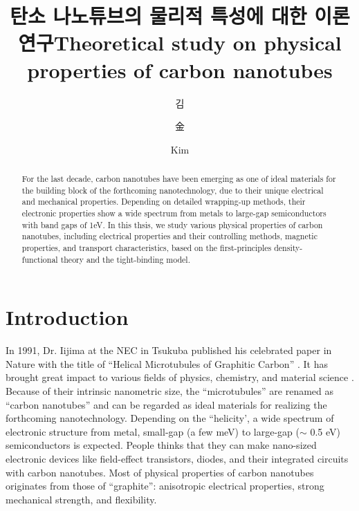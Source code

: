 \documentclass[doctor,english,final]{kaist-ucs}
\title[korean] {탄소 나노튜브의 물리적 특성에 대한 이론 연구}
\title[english]{Theoretical study on physical properties of
                carbon nanotubes}
\author[korean] {김}{용 현}
\author[chinese]{金}{容 賢}
\author[english]{Kim}{Yong-Hyun}
\begin{document}

    \begin{abstract}
        For the last decade, carbon nanotubes have been emerging as one
        of ideal materials for the building block of the forthcoming
        nanotechnology, due to their unique electrical and mechanical
        properties. Depending on detailed wrapping-up methods, their
        electronic properties show a wide spectrum from metals to
        large-gap semiconductors with band gaps of 1eV.
        In this thsis, we study various physical properties of carbon
        nanotubes, including electrical properties and their controlling
        methods, magnetic properties, and transport characteristics,
        based on the first-principles density-functional theory and
        the tight-binding model.
    \end{abstract}

    \tableofcontents

    \listoftables

    \listoffigures



\chapter{Introduction}

In 1991, Dr. Iijima at the NEC in Tsukuba published his celebrated
paper in Nature with the title of ``Helical Microtubules of Graphitic Carbon''
\cite{Iijima91}.
It has brought great impact to various fields of physics, chemistry, and
material science \cite{Dresselhaus96,Saito98}.
Because of their intrinsic nanometric size, the ``microtubules'' are renamed
as ``carbon nanotubes'' and can be regarded as ideal materials for realizing
the forthcoming nanotechnology.
Depending on the ``helicity', a wide spectrum of electronic structure
from metal, small-gap (a few meV) to large-gap ($\sim$ 0.5 eV)
semiconductors is expected.
People thinks that they can make nano-sized electronic devices like
field-effect transistors, diodes, and their integrated circuits
with carbon nanotubes.
Most of physical properties of carbon nanotubes originates from
those of ``graphite'': anisotropic electrical properties, strong
mechanical strength, and flexibility.
\end{document}
